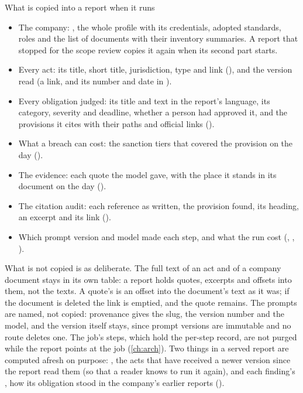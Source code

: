 \begin{codebox}{What is copied into a report when it runs}
\begin{itemize}
  \item The company: , the whole profile with its credentials,
    adopted standards, roles and the list of documents with their inventory summaries. A
    report that stopped for the scope review copies it again when its second part starts.
  \item Every act: its title, short title, jurisdiction, type and link
    (), and the version read (a link, and its number and date in
    ).
  \item Every obligation judged: its title and text in the report's language, its category,
    severity and deadline, whether a person had approved it, and the provisions it cites with
    their paths and official links ().
  \item What a breach can cost: the sanction tiers that covered the provision on the day
    ().
  \item The evidence: each quote the model gave, with the place it stands in its document on
    the day ().
  \item The citation audit: each reference as written, the provision found, its heading, an
    excerpt and its link ().
  \item Which prompt version and model made each step, and what the run cost
    (, , ).
\end{itemize}
\end{codebox}

What is not copied is as deliberate. The full text of an act and of a company document stays
in its own table: a report holds quotes, excerpts and offsets into them, not the texts. A quote's
 is an offset into the document's text as it was; if the document is deleted the
link is emptied, and the quote remains. The prompts are named, not copied: provenance gives the
slug, the version number and the model, and the version itself stays, since prompt versions
are immutable and no route deletes one. The job's steps, which hold the per-step record, are not purged while the report
points at the job (\cref{ch:arch}). Two things in a served report are computed afresh on
purpose: , the acts that have received a newer version since the report read
them (so that a reader knows to run it again), and each finding's , how its
obligation stood in the company's earlier reports ().


